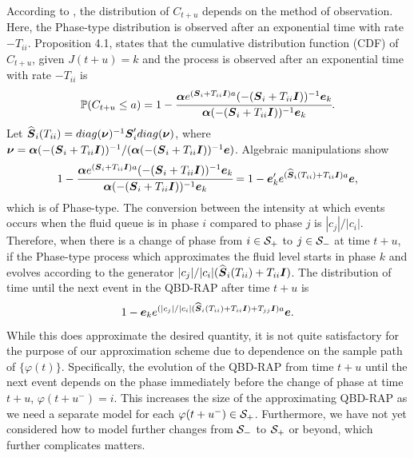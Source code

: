 According to \cite{hmp2017}, the distribution of \(C_{t+u}\) depends on the method of observation. Here, the Phase-type distribution is observed after an exponential time with rate \(-T_{ii}\). Proposition 4.1, \cite{hmp2017} states that the cumulative distribution function (CDF) of \(C_{t+u}\), given \(J(t+u)=k\) and the process is observed after an exponential time with rate \(-T_{ii}\) is 
\[\mathbb P(C_{t+u}\leq a )=1-\cfrac{\boldsymbol \alpha e^{(\boldsymbol S_i + T_{ii}\boldsymbol I)a}(-(\boldsymbol S_i+ T_{ii}\boldsymbol I))^{-1}\boldsymbol e_k}{\boldsymbol \alpha (-(\boldsymbol S_i+ T_{ii}\boldsymbol I))^{-1}\boldsymbol e_k}.\]
Let \(\widehat{ \boldsymbol S}_i(T_{ii}) = diag(\boldsymbol \nu)^{-1}\boldsymbol S_i'diag(\boldsymbol \nu)\), where \(\boldsymbol \nu = \boldsymbol\alpha(-(\boldsymbol S_i+ T_{ii}\boldsymbol I))^{-1}/(\boldsymbol\alpha(-(\boldsymbol S_i+ T_{ii}\boldsymbol I))^{-1}\boldsymbol e)\). Algebraic manipulations show
\begin{align}
	1-\cfrac{\boldsymbol \alpha e^{(\boldsymbol S_i + T_{ii}\boldsymbol I)a}(-(\boldsymbol S_i+ T_{ii}\boldsymbol I))^{-1}\boldsymbol e_k}{\boldsymbol \alpha (-(\boldsymbol S_i+ T_{ii}\boldsymbol I))^{-1}\boldsymbol e_k}
	= 1-\boldsymbol e_k' e^{(\widehat{\boldsymbol S}_i(T_{ii}) + T_{ii}\boldsymbol I)a} \boldsymbol e,\label{eqn: skgj}
\end{align}
which is of Phase-type. The conversion between the intensity at which events occurs when the fluid queue is in phase \(i\) compared to phase \(j\) is \(|c_j|/|c_i|\). %
Therefore, when there is a change of phase from \(i\in\mathcal{S}_+\) to \(j\in\mathcal{S}_-\) at time \(t+u\), if the Phase-type process which approximates the fluid level starts in phase \(k\) and evolves according to the generator \(|c_j|/|c_i|(\widehat{\boldsymbol S}_i(T_{ii}) + T_{ii}\boldsymbol I)\). The distribution of time until the next event in the QBD-RAP after time \(t+u\) is 
\[1-\boldsymbol e_k e^{(|c_j|/|c_i|(\widehat{\boldsymbol S}_i(T_{ii}) + T_{ii}\boldsymbol I) + T_{jj}\boldsymbol I)a}\boldsymbol e.\]
While this does approximate the desired quantity, it is not quite satisfactory for the purpose of our approximation scheme due to dependence on the sample path of \(\{\varphi(t)\}\). Specifically, the evolution of the QBD-RAP from time \(t+u\) until the next event depends on the phase immediately before the change of phase at time \(t+u\), \(\varphi(t+u^-)=i\). This increases the size of the approximating QBD-RAP as we need a separate model for each \(\varphi(t+u^-)\in\mathcal{S}_+\). Furthermore, we have not yet considered how to model further changes from \(\mathcal{S}_-\) to \(\mathcal{S}_+\) or beyond, which further complicates matters. 

